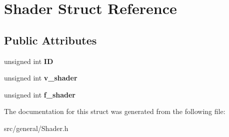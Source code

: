 \hypertarget{struct_shader}{}\section{Shader Struct Reference}
\label{struct_shader}
\subsection*{Public Attributes}
\begin{DoxyCompactItemize}
\item 
\mbox{\label{struct_shader_a142a08b6fbdfc982d82ca10ee0b0f38d}} 
unsigned int {\bfseries ID}
\item 
\mbox{\label{struct_shader_a88124248f6a68921e3c256211adab266}} 
unsigned int {\bfseries v\+\_\+shader}
\item 
\mbox{\label{struct_shader_a14273af8f766db0ce6d9ed7a37dd7696}} 
unsigned int {\bfseries f\+\_\+shader}
\end{DoxyCompactItemize}


The documentation for this struct was generated from the following file\+:\begin{DoxyCompactItemize}
\item 
src/general/Shader.\+h\end{DoxyCompactItemize}
